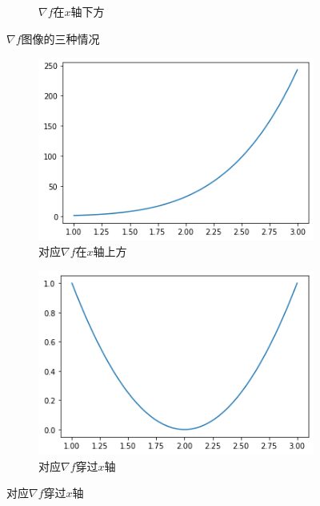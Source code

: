 \documentclass[lang=cn,10pt]{elegantbook}
\begin{document}
\begin{figure}[h]
\begin{subfigure}{0.4\linewidth}
		\caption{$\nabla f$在$x$轴下方}
		\label{cf4_3}
	\end{subfigure}
	\caption{$\nabla f$图像的三种情况}
	\label{cf41}
\end{figure}

\begin{figure}[h]
	\centering
	\begin{subfigure}{0.4\linewidth}
		\includegraphics[width=\linewidth]{img/cf4_4.png}
		\caption{对应$\nabla f$在$x$轴上方}
		\label{cf4_4}
	\end{subfigure}
	\hspace{0.5in} %
	\begin{subfigure}{0.4\linewidth}
		\includegraphics[width=\linewidth]{img/cf4_5.png}
		\caption{对应$\nabla f$穿过$x$轴}
		\label{cf4_5}
	\end{subfigure}
	\hspace{0.5in} %

\end{figure}
\end{document}
